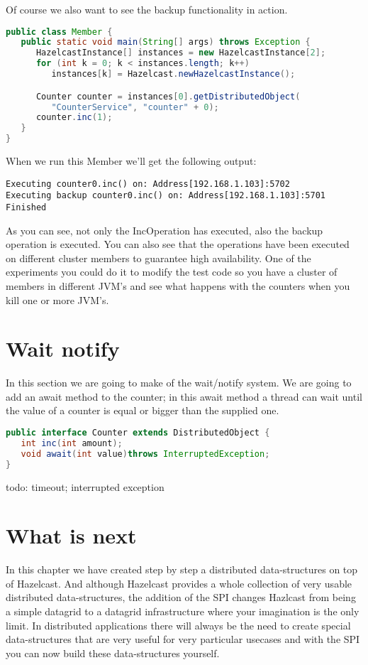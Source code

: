 Of course we also want to see the backup functionality in action.
\begin{lstlisting}[language=java]
public class Member {
   public static void main(String[] args) throws Exception {
      HazelcastInstance[] instances = new HazelcastInstance[2];
      for (int k = 0; k < instances.length; k++) 
         instances[k] = Hazelcast.newHazelcastInstance();

      Counter counter = instances[0].getDistributedObject(
         "CounterService", "counter" + 0);
      counter.inc(1);
   }
}
\end{lstlisting}
When we run this Member we'll get the following output:
\begin{lstlisting}
Executing counter0.inc() on: Address[192.168.1.103]:5702
Executing backup counter0.inc() on: Address[192.168.1.103]:5701
Finished
\end{lstlisting}
As you can see, not only the IncOperation has executed, also the backup operation is executed. You can also see that the operations have been executed on different cluster members to guarantee high availability. One of the experiments you could do it to modify the test code so you have a cluster of members in different JVM's and see what happens with the counters when you kill one or more JVM's. 

\section{Wait notify}
In this section we are going to make of the wait/notify system. We are going to add an await method to the counter; in this await method a thread can wait until the value of a counter is equal or bigger than the supplied one.

\begin{lstlisting}[language=java]
public interface Counter extends DistributedObject {
   int inc(int amount);
   void await(int value)throws InterruptedException;
}
\end{lstlisting}


todo: timeout; interrupted exception

\section{What is next}
In this chapter we have created step by step a distributed data-structures on top of Hazelcast. And although Hazelcast provides a whole collection of very usable distributed data-structures, the addition of the SPI changes Hazlcast from being a simple datagrid to a datagrid infrastructure where your imagination is the only limit. In distributed applications there will always be the need to create special data-structures that are very useful for very particular usecases and with the SPI you can now build these data-structures yourself.
